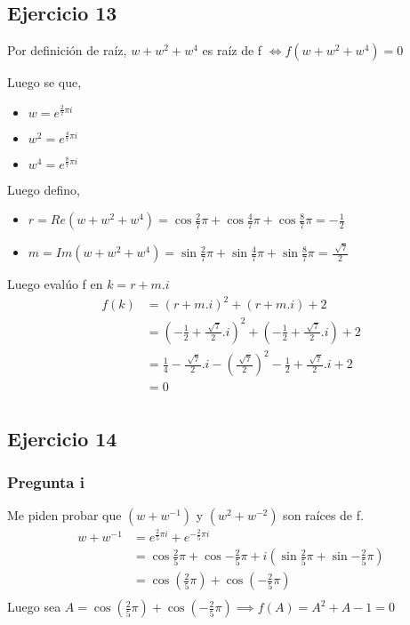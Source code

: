 \subsection{Ejercicio 13}

Por definición de raíz, $ w + w^2 + w^4 $ es raíz de f $ \iff f(w + w^2 + w^4) = 0 $

Luego se que,
\begin{itemize}
    \item $ w = e^{\frac{2}{7} \pi i} $
    \item $ w^2 = e^{\frac{4}{7} \pi i} $
    \item $ w^4 = e^{\frac{8}{7} \pi i} $
\end{itemize}
Luego defino,
\begin{itemize}
    \item $ r = Re(w + w^2 + w^4) = \cos{\frac{2}{7} \pi} + \cos{\frac{4}{7} \pi} + \cos{\frac{8}{7} \pi} = -\frac{1}{2} $
    \item $ m = Im(w + w^2 + w^4) = \sin{\frac{2}{7} \pi} + \sin{\frac{4}{7} \pi} + \sin{\frac{8}{7} \pi} = \frac{\sqrt[]{7}}{2} $
\end{itemize}
Luego evalúo f en $ k = r + m.i $
\begin{align*}
    f(k) &= (r + m.i)^2 + (r + m.i) + 2 \\
    &= (-\frac{1}{2} + \frac{\sqrt[]{7}}{2}.i)^2 + (-\frac{1}{2} + \frac{\sqrt[]{7}}{2}.i) + 2 \\
    &= \frac{1}{4} - \frac{\sqrt[]{7}}{2}.i - \left(\frac{\sqrt[]{7}}{2}\right)^2 - \frac{1}{2} + \frac{\sqrt[]{7}}{2}.i + 2 \\
    &= 0 \\
\end{align*}

\subsection{Ejercicio 14}

\subsubsection{Pregunta i}

Me piden probar que $ (w+w^{-1}) $ y $ (w^2 + w^{-2}) $ son raíces de f.
\begin{align*}
    w+w^{-1} &= e^{\frac{2}{5} \pi i} + e^{-\frac{2}{5} \pi i} \\
    &= \cos{\frac{2}{5} \pi} + \cos{-\frac{2}{5} \pi} + i\left( \sin{\frac{2}{5} \pi} + \sin{-\frac{2}{5} \pi} \right) \\
    &= \cos{(\frac{2}{5} \pi)} + \cos{(-\frac{2}{5} \pi)} \\
\end{align*}
Luego sea $ A = \cos{(\frac{2}{5} \pi)} + \cos{(-\frac{2}{5} \pi)} \implies f(A) = A^2 + A - 1 = 0 $ 

